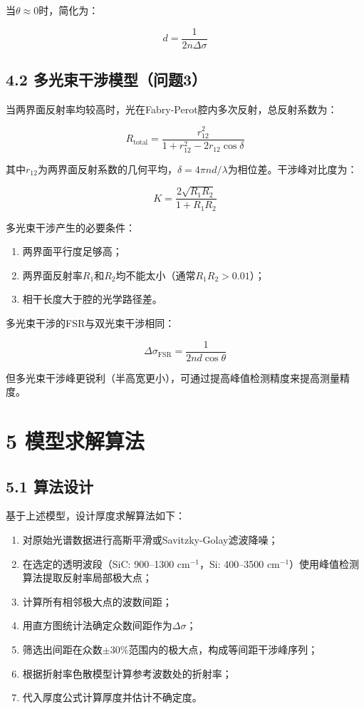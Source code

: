 \documentclass[withoutpreface]{cumcmthesis}
\begin{document}
当$\theta \approx 0$时，简化为：

\begin{equation}
d = \frac{1}{2n\Delta\sigma}
\end{equation}

\subsection{4.2 多光束干涉模型（问题3）}
当两界面反射率均较高时，光在Fabry-Perot腔内多次反射，总反射系数为：

\begin{equation}
R_{\text{total}} = \frac{r_{12}^2}{1 + r_{12}^2 - 2r_{12}\cos\delta}
\end{equation}

其中$r_{12}$为两界面反射系数的几何平均，$\delta=4\pi nd/\lambda$为相位差。干涉峰对比度为：

\begin{equation}
K = \frac{2\sqrt{R_1 R_2}}{1 + R_1 R_2}
\end{equation}

多光束干涉产生的必要条件：
\begin{enumerate}
\item 两界面平行度足够高；
\item 两界面反射率$R_1$和$R_2$均不能太小（通常$R_1 R_2 > 0.01$）；
\item 相干长度大于腔的光学路径差。
\end{enumerate}

多光束干涉的FSR与双光束干涉相同：

\begin{equation}
\Delta\sigma_{\text{FSR}} = \frac{1}{2nd\cos\theta}
\end{equation}

但多光束干涉峰更锐利（半高宽更小），可通过提高峰值检测精度来提高测量精度。

\section{5 模型求解算法}

\subsection{5.1 算法设计}
基于上述模型，设计厚度求解算法如下：

\begin{enumerate}
\item 对原始光谱数据进行高斯平滑或Savitzky-Golay滤波降噪；
\item 在选定的透明波段（SiC: 900--1300 cm$^{-1}$，Si: 400--3500 cm$^{-1}$）使用峰值检测算法提取反射率局部极大点；
\item 计算所有相邻极大点的波数间距；
\item 用直方图统计法确定众数间距作为$\Delta\sigma$；
\item 筛选出间距在众数$\pm30\%$范围内的极大点，构成等间距干涉峰序列；
\item 根据折射率色散模型计算参考波数处的折射率；
\item 代入厚度公式计算厚度并估计不确定度。
\end{enumerate}
\end{document}
